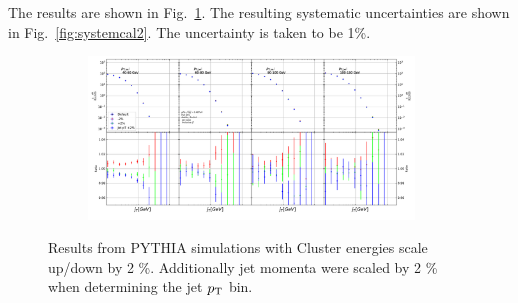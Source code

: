 The results are shown in Fig.~\ref{fig:systemcal}. The resulting systematic uncertainties are shown in Fig.~\ref{fig:systemcal2}. The uncertainty is taken to be 1\%. 

\begin{figure}
\centering
\begin{subfigure}{0.90\textwidth}
\includegraphics[width=0.95\textwidth]{figures/systematics/HadCorrComparisonJetPt4To8.pdf}
\end{subfigure}
\caption{Results from PYTHIA simulations with Cluster energies scale up/down by 2 \%. Additionally jet momenta were scaled by 2 \% when determining the jet $p_{\rm T}$ bin.}
\label{fig:systemcal}
\end{figure}

